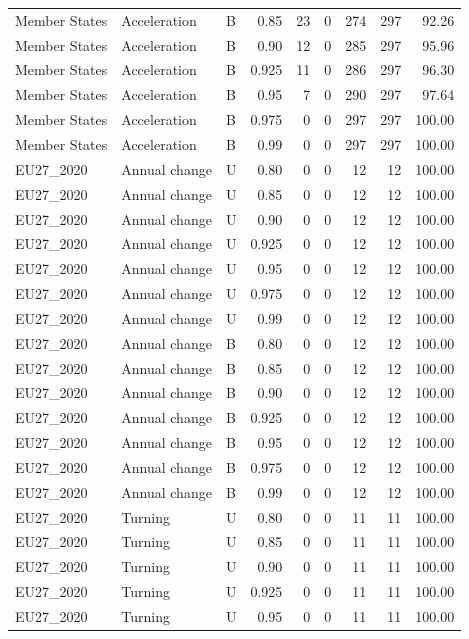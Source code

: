 \begin{longtable}{lllrrrrrr}
Member States & Acceleration & B & 0.85 & 23 & 0 & 274 & 297 & 92.26 \\
Member States & Acceleration & B & 0.90 & 12 & 0 & 285 & 297 & 95.96 \\
Member States & Acceleration & B & 0.925 & 11 & 0 & 286 & 297 & 96.30 \\
Member States & Acceleration & B & 0.95 & 7 & 0 & 290 & 297 & 97.64 \\
Member States & Acceleration & B & 0.975 & 0 & 0 & 297 & 297 & 100.00 \\
Member States & Acceleration & B & 0.99 & 0 & 0 & 297 & 297 & 100.00 \\
EU27\_2020 & Annual change & U & 0.80 & 0 & 0 & 12 & 12 & 100.00 \\
EU27\_2020 & Annual change & U & 0.85 & 0 & 0 & 12 & 12 & 100.00 \\
EU27\_2020 & Annual change & U & 0.90 & 0 & 0 & 12 & 12 & 100.00 \\
EU27\_2020 & Annual change & U & 0.925 & 0 & 0 & 12 & 12 & 100.00 \\
EU27\_2020 & Annual change & U & 0.95 & 0 & 0 & 12 & 12 & 100.00 \\
EU27\_2020 & Annual change & U & 0.975 & 0 & 0 & 12 & 12 & 100.00 \\
EU27\_2020 & Annual change & U & 0.99 & 0 & 0 & 12 & 12 & 100.00 \\
EU27\_2020 & Annual change & B & 0.80 & 0 & 0 & 12 & 12 & 100.00 \\
EU27\_2020 & Annual change & B & 0.85 & 0 & 0 & 12 & 12 & 100.00 \\
EU27\_2020 & Annual change & B & 0.90 & 0 & 0 & 12 & 12 & 100.00 \\
EU27\_2020 & Annual change & B & 0.925 & 0 & 0 & 12 & 12 & 100.00 \\
EU27\_2020 & Annual change & B & 0.95 & 0 & 0 & 12 & 12 & 100.00 \\
EU27\_2020 & Annual change & B & 0.975 & 0 & 0 & 12 & 12 & 100.00 \\
EU27\_2020 & Annual change & B & 0.99 & 0 & 0 & 12 & 12 & 100.00 \\
EU27\_2020 & Turning & U & 0.80 & 0 & 0 & 11 & 11 & 100.00 \\
EU27\_2020 & Turning & U & 0.85 & 0 & 0 & 11 & 11 & 100.00 \\
EU27\_2020 & Turning & U & 0.90 & 0 & 0 & 11 & 11 & 100.00 \\
EU27\_2020 & Turning & U & 0.925 & 0 & 0 & 11 & 11 & 100.00 \\
EU27\_2020 & Turning & U & 0.95 & 0 & 0 & 11 & 11 & 100.00 \\

\end{longtable}
